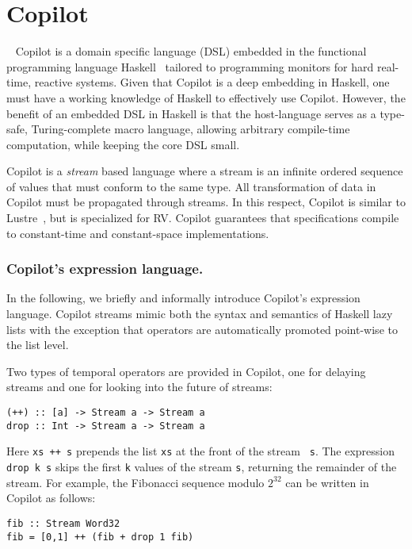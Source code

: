 \section{Copilot}~\label{sec:co-intro} 
Copilot is a domain specific language (DSL)  embedded in the functional
programming language Haskell~\cite{Haskell98}   tailored to
programming monitors for hard real-time, reactive systems. Given that
Copilot is a deep embedding in Haskell, one must have a working
knowledge of Haskell to effectively use Copilot. However, the benefit of an
embedded DSL in Haskell is that the host-language serves as a type-safe,
Turing-complete macro language, allowing arbitrary compile-time computation,
while keeping the core DSL small.

Copilot is a \emph{stream} based language where a stream is an infinite ordered
sequence of values that must conform to the same type.  All transformation of
data in Copilot must be propagated through streams.  In this respect, Copilot is
similar to Lustre~\cite{CaspiPHP87}, but is specialized for RV. Copilot
guarantees that specifications compile to constant-time and constant-space
implementations.

\subsubsection{Copilot's expression language.}
In the following, we briefly and informally introduce Copilot's expression
language.  Copilot streams mimic both the syntax and semantics of
Haskell lazy lists with the exception that  operators are
automatically promoted point-wise to the list level. 

Two types of temporal operators are provided in Copilot, one for
delaying streams and one for looking into the future of streams:
\begin{lstlisting}[frame=single]
(++) :: [a] -> Stream a -> Stream a
drop :: Int -> Stream a -> Stream a
\end{lstlisting}
%
Here {\tt xs ++ s} prepends the list {\tt xs} at the front of the stream {\tt
  s}.  The expression {\tt drop k s} skips the first {\tt k} values of the
stream {\tt s}, returning the remainder of the stream. For example, the
Fibonacci sequence modulo $2^{32}$ can be written in Copilot as follows:

\begin{lstlisting}[frame=single]
fib :: Stream Word32
fib = [0,1] ++ (fib + drop 1 fib)
\end{lstlisting}
%

